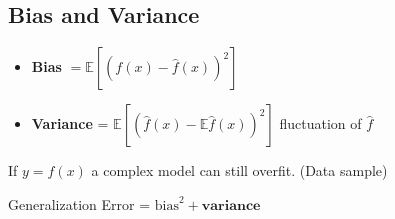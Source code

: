 \subsection{Bias and Variance}

\begin{itemize}
    \item \textbf{Bias} $= \mathbb{E}\left[(f(x) - \hat{f}(x))^2\right]$ 
    \item \textbf{Variance} = $\mathbb{E}\left[(\hat{f}(x) - \mathbb{E}\hat{f}(x))^2\right]$ fluctuation of $\hat{f}$\\
\end{itemize}

If $y = f(x)$ a complex model can still overfit. (Data sample)

Generalization Error = $\text{bias}^2 + \textbf{variance}$






